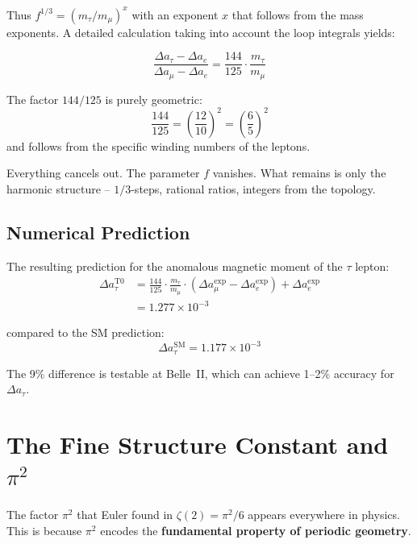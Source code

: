 	Thus $f^{1/3} = (m_\tau/m_\mu)^x$ with an exponent $x$ that follows from the mass exponents. A detailed calculation taking into account the loop integrals yields:
	
	\begin{keypoint}
		\begin{equation}
			\frac{\Delta a_\tau - \Delta a_e}{\Delta a_\mu - \Delta a_e} = \frac{144}{125} \cdot \frac{m_\tau}{m_\mu}
			\label{eq:bridge-formula}
		\end{equation}
	\end{keypoint}
	
	The factor $144/125$ is purely geometric:
	\begin{equation}
		\frac{144}{125} = \left( \frac{12}{10} \right)^2 = \left( \frac{6}{5} \right)^2
	\end{equation}
	and follows from the specific winding numbers of the leptons.
	
	Everything cancels out. The parameter $f$ vanishes. What remains is only the harmonic structure -- $1/3$-steps, rational ratios, integers from the topology.
	
	\subsection{Numerical Prediction}
	
	The resulting prediction for the anomalous magnetic moment of the $\tau$ lepton:
	\begin{align}
		\Delta a_\tau^{\text{T0}} &= \frac{144}{125} \cdot \frac{m_\tau}{m_\mu} \cdot (\Delta a_\mu^{\text{exp}} - \Delta a_e^{\text{exp}}) + \Delta a_e^{\text{exp}} \\
		&= 1.277 \times 10^{-3}
	\end{align}
	
	compared to the SM prediction:
	\begin{equation}
		\Delta a_\tau^{\text{SM}} = 1.177 \times 10^{-3}
	\end{equation}
	
	The 9\% difference is testable at Belle~II, which can achieve 1--2\% accuracy for $\Delta a_\tau$.


	\section{The Fine Structure Constant and $\pi^2$}
	
	The factor $\pi^2$ that Euler found in $\zeta(2) = \pi^2/6$ appears everywhere in physics. This is because $\pi^2$ encodes the \textbf{fundamental property of periodic geometry}.
	
